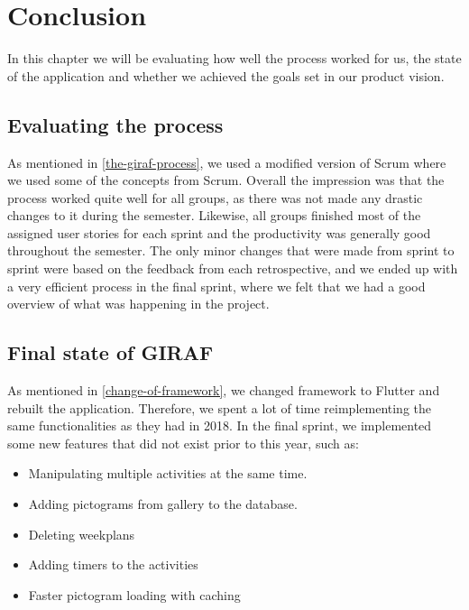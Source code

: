 \chapter{Conclusion}
In this chapter we will be evaluating how well the process worked for us, the state of the application and whether we achieved the goals set in our product vision.

\section{Evaluating the process}
As mentioned in \autoref{the-giraf-process}, we used a modified version of Scrum where we used some of the concepts from Scrum.
Overall the impression was that the process worked quite well for all groups, as there was not made any drastic changes to it during the semester.
Likewise, all groups finished most of the assigned user stories for each sprint and the productivity was generally good throughout the semester.
The only minor changes that were made from sprint to sprint were based on the feedback from each retrospective, and we ended up with a very efficient process in the final sprint, where we felt that we had a good overview of what was happening in the project.

\section{Final state of GIRAF}
As mentioned in \autoref{change-of-framework}, we changed framework to Flutter and rebuilt the application.
Therefore, we spent a lot of time reimplementing the same functionalities as they had in 2018.
In the final sprint, we implemented some new features that did not exist prior to this year, such as:
\begin{itemize}
    \item Manipulating multiple activities at the same time.
    \item Adding pictograms from gallery to the database.
    \item Deleting weekplans
    \item Adding timers to the activities
    \item Faster pictogram loading with caching
\end{itemize}

